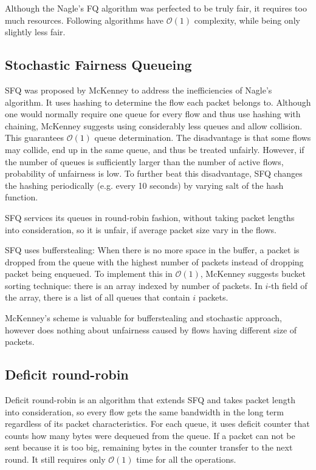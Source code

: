 Although the Nagle's FQ algorithm was perfected to be truly fair, it requires too much resources. Following algorithms have $\mathcal{O}(1)$ complexity, while being only slightly less fair.


\subsection{Stochastic Fairness Queueing}


SFQ was proposed by McKenney \cite{SFQ} to address the inefficiencies of Nagle’s algorithm. It uses hashing to determine the flow each packet belongs to. Although one would normally require one queue for every flow and thus use hashing with chaining, McKenney suggests using considerably less queues and allow collision. This guarantees $\mathcal{O}(1)$ queue determination. The disadvantage is that some flows may collide, end up in the same queue, and thus be treated unfairly. However, if the number of queues is sufficiently larger than the number of active flows, probability of unfairness is low. To further beat this disadvantage, SFQ changes the hashing periodically (e.g. every 10 seconds) by varying salt of the hash function.

SFQ services its queues in round-robin fashion, without taking packet lengths into consideration, so it is unfair, if average packet size vary in the flows.

SFQ uses bufferstealing: When there is no more space in the buffer, a packet is dropped from the queue with the highest number of packets instead of dropping packet being enqueued. To implement this in $\mathcal{O}(1)$, McKenney suggests bucket sorting technique: there is an array indexed by number of packets. In $i$-th field of the array, there is a list of all queues that contain $i$ packets.

McKenney's scheme is valuable for bufferstealing and stochastic approach, however does nothing about unfairness caused by flows having different size of packets.

\subsection{Deficit round-robin}
\label{DRR}
Deficit round-robin \cite{EffDRR} is an algorithm that extends SFQ and takes packet length into consideration, so every flow gets the same bandwidth in the long term regardless of its packet characteristics. For each queue, it uses deficit counter that counts how many bytes were dequeued from the queue. If a packet can not be sent because it is too big, remaining bytes in the counter transfer to the next round. It still requires only $\mathcal{O}(1)$ time for all the operations.

